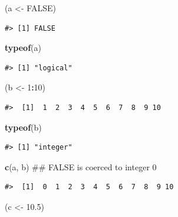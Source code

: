\documentclass[]{book}
\newenvironment{Shaded}{\begin{snugshade}}{\end{snugshade}}
\newcommand{\KeywordTok}[1]{\textcolor[rgb]{0.13,0.29,0.53}{\textbf{#1}}}
\newcommand{\DecValTok}[1]{\textcolor[rgb]{0.00,0.00,0.81}{#1}}
\newcommand{\FloatTok}[1]{\textcolor[rgb]{0.00,0.00,0.81}{#1}}
\newcommand{\StringTok}[1]{\textcolor[rgb]{0.31,0.60,0.02}{#1}}
\newcommand{\OtherTok}[1]{\textcolor[rgb]{0.56,0.35,0.01}{#1}}
\newcommand{\OperatorTok}[1]{\textcolor[rgb]{0.81,0.36,0.00}{\textbf{#1}}}
\newcommand{\NormalTok}[1]{#1}
\theoremstyle{definition}
\theoremstyle{definition}
\theoremstyle{definition}
\theoremstyle{remark}
\begin{document}
\begin{Shaded}
\begin{Highlighting}[]
\NormalTok{(a <-}\StringTok{ }\OtherTok{FALSE}\NormalTok{)}
\end{Highlighting}
\end{Shaded}

\begin{verbatim}
#> [1] FALSE
\end{verbatim}

\begin{Shaded}
\begin{Highlighting}[]
\KeywordTok{typeof}\NormalTok{(a)}
\end{Highlighting}
\end{Shaded}

\begin{verbatim}
#> [1] "logical"
\end{verbatim}

\begin{Shaded}
\begin{Highlighting}[]
\NormalTok{(b <-}\StringTok{ }\DecValTok{1}\OperatorTok{:}\DecValTok{10}\NormalTok{)}
\end{Highlighting}
\end{Shaded}

\begin{verbatim}
#>  [1]  1  2  3  4  5  6  7  8  9 10
\end{verbatim}

\begin{Shaded}
\begin{Highlighting}[]
\KeywordTok{typeof}\NormalTok{(b)}
\end{Highlighting}
\end{Shaded}

\begin{verbatim}
#> [1] "integer"
\end{verbatim}

\begin{Shaded}
\begin{Highlighting}[]
\KeywordTok{c}\NormalTok{(a, b)         ## FALSE is coerced to integer 0}
\end{Highlighting}
\end{Shaded}

\begin{verbatim}
#>  [1]  0  1  2  3  4  5  6  7  8  9 10
\end{verbatim}

\begin{Shaded}
\begin{Highlighting}[]
\NormalTok{(c <-}\StringTok{ }\FloatTok{10.5}\NormalTok{)}
\end{Highlighting}
\end{Shaded}
\end{document}
